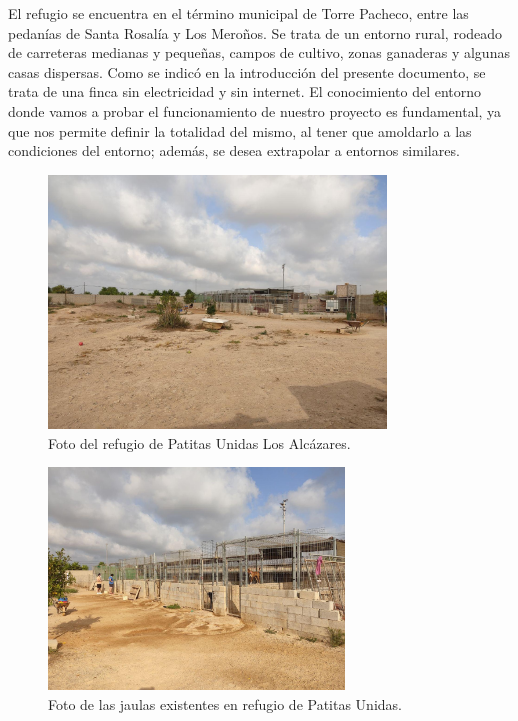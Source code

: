 \documentclass[12pt]{article}
\begin{document}
	\noindent El refugio se encuentra en el término municipal de Torre Pacheco, entre las pedanías de Santa Rosalía y Los Meroños. Se trata de un entorno rural, rodeado de carreteras medianas y pequeñas, campos de cultivo, zonas ganaderas y algunas casas dispersas. Como se indicó en la introducción del presente documento, se trata de una finca sin electricidad y sin internet. El conocimiento del entorno donde vamos a probar el funcionamiento de nuestro proyecto es fundamental, ya que nos permite definir la totalidad del mismo, al tener que amoldarlo a las condiciones del entorno; además, se desea extrapolar a entornos similares. \\
	
	\begin{figure}[h!]
		\begin{center}
			\includegraphics[width=0.8\textwidth]{img/refugio_global.jpg}
			\caption{Foto del refugio de Patitas Unidas Los Alcázares.}
			\label{Foto global refugio}
		\end{center}
	\end{figure}
	
	\pagebreak

	\begin{figure}[h!]
		\begin{center}
			\includegraphics[width=0.7\textwidth]{img/refugio_jaulas.jpg}
			\caption{Foto de las jaulas existentes en refugio de Patitas Unidas.}
			\label{Foto jaulas refugio}
		\end{center}
	\end{figure}
	
\end{document}
